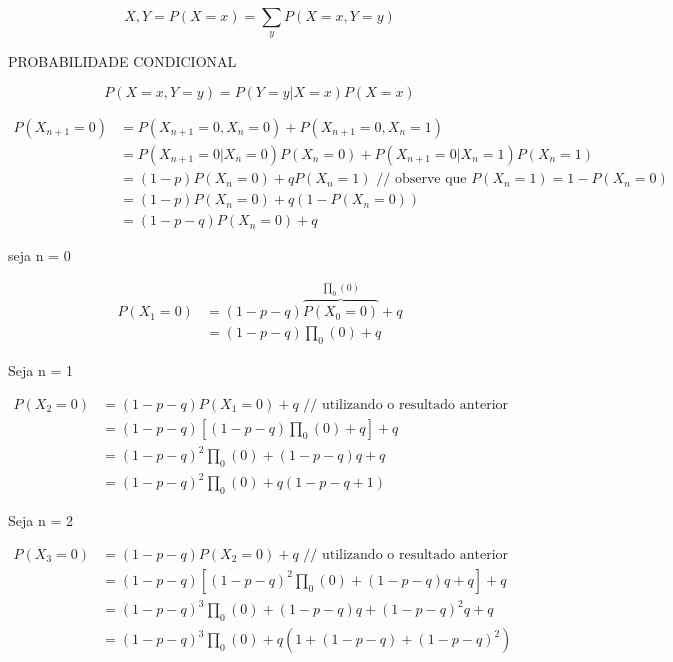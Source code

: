 \documentclass[]{article}
\theoremstyle{definition}
\theoremstyle{definition}
\theoremstyle{definition}
\theoremstyle{remark}
\let\BeginKnitrBlock\begin \let\EndKnitrBlock\end
\begin{document}
\BeginKnitrBlock{theorem}[Probabilidade Total]
\protect\hypertarget{thm:unnamed-chunk-23}{}{\label{thm:unnamed-chunk-23}
{}
}\[X,Y = P(X=x) = \sum_y P(X=x,Y=y)\]
\EndKnitrBlock{theorem}

PROBABILIDADE CONDICIONAL

\[P(X=x,Y=y) = P(Y=y|X=x)P(X=x)\]

\begin{equation}
\begin{split}
P(X_{n+1}=0) &= P(X_{n+1}=0,X_{n}=0) + P(X_{n+1}=0,X_n=1) \\
&= P(X_{n+1}=0|X_n = 0)P(X_n=0) + P(X_{n+1}=0|X_n = 1)P(X_n=1)\\
&= (1-p)P(X_n=0) + qP(X_n=1) \text{  // observe que }P(X_n=1)=1 -
P(X_n=0)\\
&= (1-p)P(X_n=0)+ q(1-P(X_n=0))\\
&= (1-p-q)P(X_n=0) + q
\end{split}
\end{equation}

seja n = 0

\begin{equation}
\begin{split}
P(X_1=0) &= (1-p-q)\overbrace{P(X_0=0)}^{\prod_0(0)} + q\\
&=(1-p-q)\prod_0(0) + q
\end{split}
\end{equation}

Seja n = 1

\begin{equation}
\begin{split}
P(X_2=0)&=(1-p-q)P(X_1=0) + q \text{ // utilizando o resultado
anterior}\\
&= (1-p-q)[(1-p-q)\prod_0(0) + q] + q\\
&= (1-p-q)^2 \prod_0(0) + (1-p-q)q + q\\
&= (1-p-q)^2\prod_0(0) + q(1-p-q + 1)
\end{split}
\end{equation}

Seja n = 2

\begin{equation}
\begin{split}
P(X_3=0)&=(1-p-q)P(X_2=0) + q \text{ // utilizando o resultado
anterior}\\
&= (1-p-q)[(1-p-q)^2\prod_0(0) + (1-p-q)q + q] + q\\
&= (1-p-q)^3 \prod_0(0) + (1-p-q)q + (1-p-q)^2q + q\\
&= (1-p-q)^3 \prod_0(0) + q(1 + (1-p-q) + (1-p-q)^2)
\end{split}
\end{equation}
\end{document}
